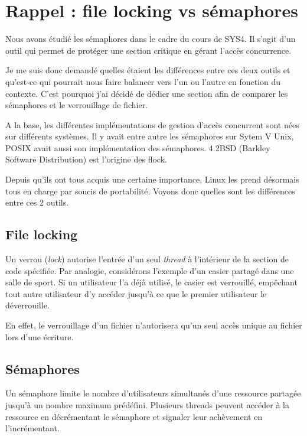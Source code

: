 \newpage
\section{Rappel : file locking vs sémaphores}

Nous avons étudié les sémaphores dans le cadre du cours de SYS4\cite{Mba}. Il s'agit d'un outil qui permet de protéger une section critique en gérant l'accès concurrence.


Je me suis donc demandé quelles étaient les différences entre ces deux outils et qu'est-ce qui pourrait nous faire balancer vers l'un ou l'autre en fonction du contexte. C'est pourquoi j'ai décidé de dédier une section afin de comparer les sémaphores et le verrouillage de fichier.


A la base, les différentes implémentations de gestion d'accès concurrent sont nées sur différents systèmes. Il y avait entre autre les sémaphores sur Sytem V Unix, POSIX avait aussi son implémentation des sémaphores. 4.2BSD\cite{42BSD} (Barkley Software Distribution) est l'origine des flock.


Depuis qu'ils ont tous acquis une certaine importance, Linux les prend désormais tous en charge par soucis de portabilité.
\newline
\newline
Voyons donc quelles sont les différences entre ces 2 outils.

\subsection{File locking\cite{diffSemLock}}

Un verrou (\textit{lock}) autorise l'entrée d'un seul \textit{thread} à l'intérieur de la section de code spécifiée. Par analogie, considérons l'exemple d'un casier partagé dans une salle de sport. Si un utilisateur l'a déjà utilisé, le casier est verrouillé, empêchant tout autre utilisateur d'y accéder jusqu'à ce que le premier utilisateur le déverrouille.

En effet, le verrouillage d'un fichier n'autorisera qu'un seul accès unique au fichier lors d'une écriture.

\subsection{Sémaphores\cite{diffSemLock2}}
Un sémaphore limite le nombre d'utilisateurs simultanés d'une ressource partagée jusqu'à un nombre maximum prédéfini. Plusieurs threads peuvent accéder à la ressource en décrémentant le sémaphore et signaler leur achèvement en l'incrémentant.

